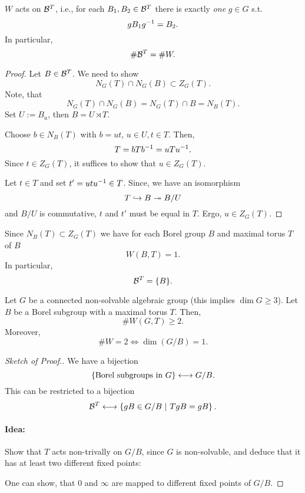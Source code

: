 \begin{theorem}
	$W$ acts  on $\mathcal{B}^T$, i.e., for each $B_1, B_2 \in \mathcal{B}^T$ there is exactly \emph{one} $g \in G$ s.t.
	\[ gB_1g^{-1} = B_2. \]
	In particular,
	\[ \#\mathcal{B}^T = \# W. \]
\end{theorem}
\begin{proof}
	Let $B \in \mathcal{B}^T$. We need to show
	\[ N_G(T) \cap N_G(B) \subset Z_G(T). \]
	Note, that
	\[ N_G(T) \cap N_G(B) = N_G(T) \cap B = N_B(T). \]
	Set $U := B_u$, then $B = U \rtimes T$.
	
	Choose $b \in N_B(T)$ with $b = ut$, $u\in U, t \in T$. Then,
	\[ T = bTb^{-1} = uTu^{-1}. \]
	Since $t \in Z_G(T)$, it suffices to show that $u \in Z_G(T)$.
	
	Let $t \in T$ and set $t' = utu^{-1} \in T$. Since, we have an isomorphism
	\[ T \overset{}{\hookrightarrow} B \overset{}{\twoheadrightarrow} B/U \]
	and $B/U$ is commutative, $t$ and $t'$ must be equal in $T$. Ergo, $u \in Z_G(T)$.
\end{proof}

\begin{corollary}
	Since $N_B(T) \subset Z_G(T)$ we have for each Borel group $B$ and maximal torus $T$ of $B$
	\[ W(B,T) = 1. \]
	In particular,
	\[\mathcal{B}^T = \{B\}. \]
\end{corollary}

\begin{proposition}
Let $G$ be a connected non-solvable algebraic group (this implies $\dim G \geq 3$). Let $B$ be a Borel subgroup with a maximal torus $T$. Then,
\[\# W(G,T) \geq 2. \]
Moreover,
\[\# W = 2 \iff \dim(G / B) = 1. \]
\end{proposition}
\begin{proof}[Sketch of Proof.]
	We have a bijection
	\[ \left\lbrace\text{Borel subgroups in }G\right\rbrace \longleftrightarrow G / B. \]
	This can be restricted to a bijection
	\[ \mathcal{B}^T \longleftrightarrow \left\lbrace gB \in G/B ~ | ~ TgB = gB\right\rbrace. \]
	\paragraph{Idea:} Show that $T$ acts non-trivally on $G/B$, since $G$ is non-solvable, and deduce that it has at least two different fixed points:
	\begin{center}
	\end{center}
One can show, that $0$ and $\infty$ are mapped to different fixed points of $G/B$.
\end{proof}